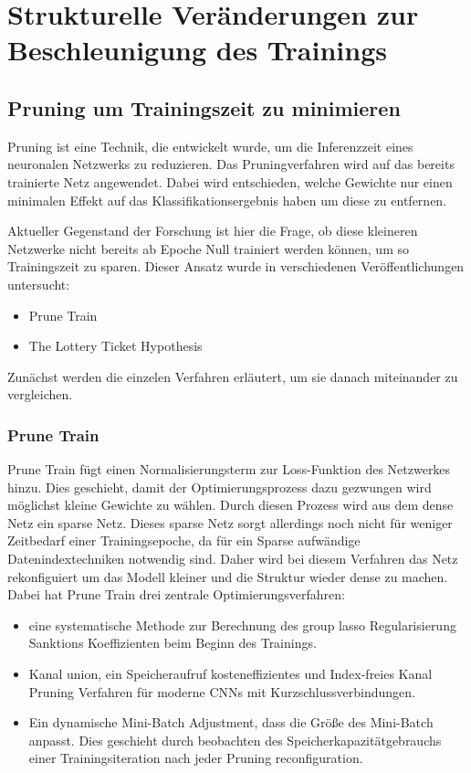 \chapter{Strukturelle Veränderungen zur Beschleunigung des Trainings}

\section{Pruning um Trainingszeit zu minimieren}
Pruning ist eine Technik, die entwickelt wurde, um die Inferenzzeit eines neuronalen Netzwerks zu reduzieren. Das Pruningverfahren wird auf das bereits trainierte Netz angewendet. Dabei wird entschieden, welche Gewichte nur einen minimalen Effekt auf das Klassifikationsergebnis haben um diese zu entfernen.

Aktueller Gegenstand der Forschung ist hier die Frage, ob diese kleineren Netzwerke nicht bereits ab Epoche Null trainiert werden können, um so Trainingszeit zu sparen. Dieser Ansatz wurde in verschiedenen Veröffentlichungen untersucht:
\begin{itemize}
 \item Prune Train 
 \item The Lottery Ticket Hypothesis
\end{itemize}
Zunächst werden die einzelen Verfahren erläutert, um sie danach miteinander zu vergleichen.

\subsection{Prune Train}
Prune Train fügt einen Normalisierungsterm zur Loss-Funktion des Netzwerkes hinzu. Dies geschieht, damit der Optimierungsprozess dazu gezwungen wird möglichst kleine Gewichte zu wählen. Durch diesen Prozess wird aus dem dense Netz ein sparse Netz. Dieses sparse Netz sorgt allerdings noch nicht für weniger Zeitbedarf einer Trainingsepoche, da für ein Sparse aufwändige Datenindextechniken notwendig sind. Daher wird bei diesem Verfahren das Netz rekonfiguiert um das Modell kleiner und die Struktur wieder dense zu machen.
Dabei hat Prune Train drei zentrale Optimierungsverfahren:
\begin{itemize}
   \item eine systematische Methode zur Berechnung des group lasso Regularisierung Sanktions Koeffizienten beim Beginn des Trainings.
   \item Kanal union, ein Speicheraufruf kosteneffizientes und Index-freies Kanal Pruning Verfahren für moderne CNNs mit Kurzschlussverbindungen.
   \item Ein dynamische Mini-Batch Adjustment, dass die Größe des Mini-Batch anpasst. Dies geschieht durch beobachten des Speicherkapazitätgebrauchs einer Trainingsiteration nach jeder Pruning reconfiguration.
\end{itemize} 

